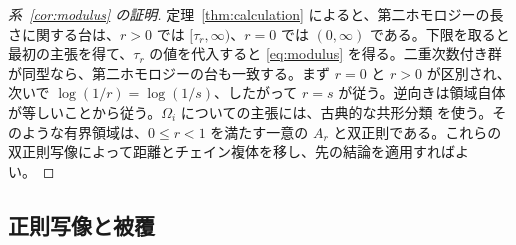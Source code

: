 \documentclass[12pt]{amsart}
\theoremstyle{definition}
\theoremstyle{remark}
\numberwithin{equation}{section}
\begin{document}
\begin{proof}[系~\ref{cor:modulus} の証明]
定理~\ref{thm:calculation} によると、第二ホモロジーの長さに関する台は、$r>0$ では $[\tau_r,\infty)$、$r=0$ では $(0,\infty)$ である。下限を取ると最初の主張を得て、$\tau_r$ の値を代入すると \eqref{eq:modulus} を得る。二重次数付き群が同型なら、第二ホモロジーの台も一致する。まず $r=0$ と $r>0$ が区別され、次いで $\log(1/r)=\log(1/s)$、したがって $r=s$ が従う。逆向きは領域自体が等しいことから従う。$\Omega_i$ についての主張には、古典的な共形分類 \cite[\S12]{BM} を使う。そのような有界領域は、$0\le r<1$ を満たす一意の $A_r$ と双正則である。これらの双正則写像によって距離とチェイン複体を移し、先の結論を適用すればよい。
\end{proof}

\subsection{正則写像と被覆}
\end{document}
